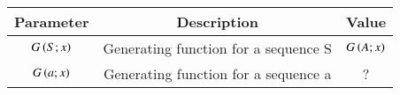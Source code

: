 \begin{tabular}{|c|c|c|}
   \hline
    \textbf{Parameter} & \textbf{Description} & \textbf{Value} \\
   \hline
    $G\left(S;x\right)$ & Generating function for a sequence S& $ G\left(A;x\right)$\\
   \hline
   $ G\left(a;x\right)$ & Generating function for a sequence a&? \\
   \hline
\end{tabular}

